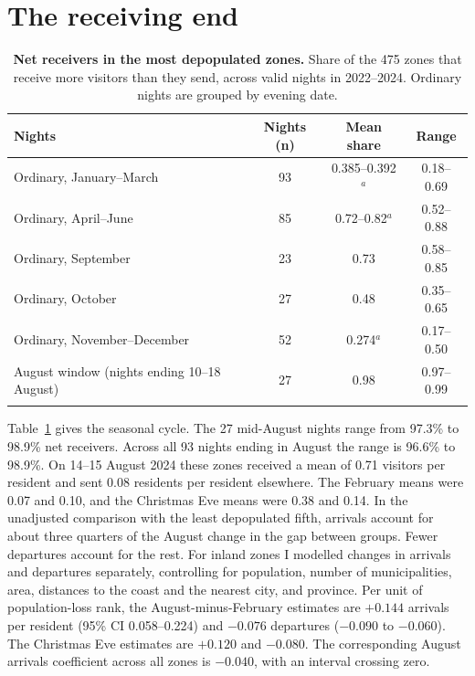 \documentclass[pdflatex,sn-mathphys-num]{sn-jnl}
\begin{document}
\FloatBarrier
\section{The receiving end}\label{si:receiving}

\begin{table}[!htbp]
\caption{\textbf{Net receivers in the most depopulated zones.} Share of the 475 zones that receive more visitors than they send, across valid nights in 2022--2024. Ordinary nights are grouped by evening date.}\label{tab:receiving}
\footnotesize
\begin{tabular*}{\textwidth}{@{\extracolsep\fill}lccc}
\toprule
Nights & Nights (n) & Mean share & Range \\
\midrule
Ordinary, January--March & 93 & 0.385--0.392$^{a}$ & 0.18--0.69 \\
Ordinary, April--June & 85 & 0.72--0.82$^{a}$ & 0.52--0.88 \\
Ordinary, September & 23 & 0.73 & 0.58--0.85 \\
Ordinary, October & 27 & 0.48 & 0.35--0.65 \\
Ordinary, November--December & 52 & 0.274$^{a}$ & 0.17--0.50 \\
August window (nights ending 10--18 August) & 27 & 0.98 & 0.97--0.99 \\
\botrule
\end{tabular*}
\end{table}

Table~\ref{tab:receiving} gives the seasonal cycle. The 27 mid-August nights range from 97.3\% to 98.9\% net receivers. Across all 93 nights ending in August the range is 96.6\% to 98.9\%. On 14--15 August 2024 these zones received a mean of 0.71 visitors per resident and sent 0.08 residents per resident elsewhere. The February means were 0.07 and 0.10, and the Christmas Eve means were 0.38 and 0.14. In the unadjusted comparison with the least depopulated fifth, arrivals account for about three quarters of the August change in the gap between groups. Fewer departures account for the rest. For inland zones I modelled changes in arrivals and departures separately, controlling for population, number of municipalities, area, distances to the coast and the nearest city, and province. Per unit of population-loss rank, the August-minus-February estimates are $+0.144$ arrivals per resident (95\% CI 0.058--0.224) and $-0.076$ departures ($-0.090$ to $-0.060$). The Christmas Eve estimates are $+0.120$ and $-0.080$. The corresponding August arrivals coefficient across all zones is $-0.040$, with an interval crossing zero.
\end{document}
